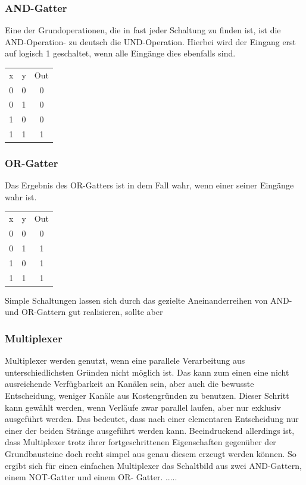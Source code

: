 \documentclass[conference]{IEEEtran}
\begin{document}
\subsubsection{AND-Gatter}
Eine der Grundoperationen, die in fast jeder Schaltung zu finden ist, ist die AND-Operation- zu deutsch die UND-Operation. Hierbei wird der Eingang erst auf logisch 1 geschaltet, wenn alle Eingänge dies ebenfalls sind.\\
\begin{center}
\begin{tabular}[h]{ccc}
x&y&Out\\
0&0&0\\
0&1&0\\
1&0&0\\
1&1&1\\
\end{tabular}
\end{center}
\subsubsection{OR-Gatter}
Das Ergebnis des OR-Gatters ist in dem Fall wahr, wenn einer seiner Eingänge wahr ist.\\
\begin{center}
\begin{tabular}[h]{ccc}
x&y&Out\\
0&0&0\\
0&1&1\\
1&0&1\\
1&1&1\\
\end{tabular}
\end{center}
Simple Schaltungen lassen sich durch das gezielte Aneinanderreihen von AND- und OR-Gattern gut realisieren, sollte aber 
\subsubsection{Multiplexer}
Multiplexer werden genutzt, wenn eine parallele Verarbeitung aus unterschiedlichsten Gründen nicht möglich ist. Das kann zum einen eine nicht ausreichende Verfügbarkeit an Kanälen sein, aber auch die bewusste Entscheidung, weniger Kanäle aus Kostengründen zu benutzen. Dieser Schritt kann gewählt werden, wenn Verläufe zwar parallel laufen, aber nur exklusiv ausgeführt werden. Das bedeutet, dass nach einer elementaren Entscheidung nur einer der beiden Stränge ausgeführt werden kann. Beeindruckend allerdings ist, dass Multiplexer trotz ihrer fortgeschrittenen Eigenschaften gegenüber der Grundbausteine doch recht simpel aus genau diesem erzeugt werden können. So ergibt sich für einen einfachen Multiplexer das Schaltbild aus zwei AND-Gattern, einem NOT-Gatter und einem OR- Gatter. .....
\end{document}
